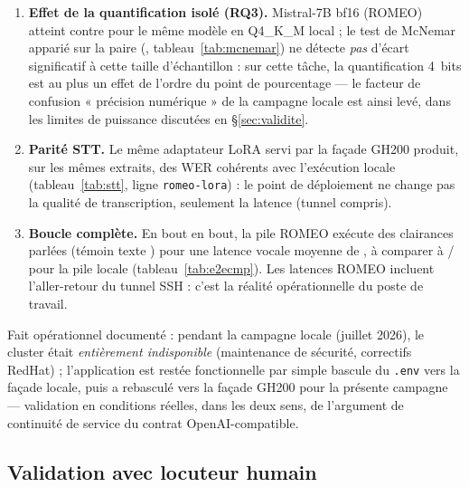 \documentclass[10pt,a4paper]{article}
\newcommand{\syst}[1]{\texttt{#1}}
\begin{document}
\begin{enumerate}
  \item \textbf{Effet de la quantification isolé (RQ3).} Mistral-7B bf16
    (ROMEO) atteint \nLLMRomeoAcc{} contre \nLLMBestAcc{} pour le même
    modèle en Q4\_K\_M local ; le test de McNemar apparié sur la paire
    (\nMcnQuantDetail{}, tableau~\ref{tab:mcnemar}) ne détecte \emph{pas}
    d'écart significatif à cette taille d'échantillon : sur cette tâche, la
    quantification 4~bits est au plus un effet de l'ordre du point de
    pourcentage --- le facteur de confusion « précision numérique » de la
    campagne locale est ainsi levé, dans les limites de puissance
    discutées en \S\ref{sec:validite}.
  \item \textbf{Parité STT.} Le même adaptateur LoRA servi par la façade
    GH200 produit, sur les mêmes extraits, des WER cohérents avec
    l'exécution locale (tableau~\ref{tab:stt}, ligne \syst{romeo-lora}) :
    le point de déploiement ne change pas la qualité de transcription,
    seulement la latence (tunnel compris).
  \item \textbf{Boucle complète.} En bout en bout, la pile ROMEO exécute
    \nEERomeoVoix{} des clairances parlées (témoin texte \nEERomeoTexte)
    pour une latence vocale moyenne de \nEERomeoLatMoy, à comparer à
    \nEEVoix{} / \nEELatMoy{} pour la pile locale
    (tableau~\ref{tab:e2ecmp}). Les latences ROMEO incluent l'aller-retour
    du tunnel SSH : c'est la réalité opérationnelle du poste de travail.
\end{enumerate}

Fait opérationnel documenté : pendant la campagne locale (juillet 2026), le
cluster était \emph{entièrement indisponible} (maintenance de sécurité,
correctifs RedHat) ; l'application est restée fonctionnelle par simple
bascule du \syst{.env} vers la façade locale, puis a rebasculé vers la
façade GH200 pour la présente campagne --- validation en conditions
réelles, dans les deux sens, de l'argument de continuité de service du
contrat OpenAI-compatible.

\subsection{Validation avec locuteur humain}
\label{sec:res-humain}
\end{document}
